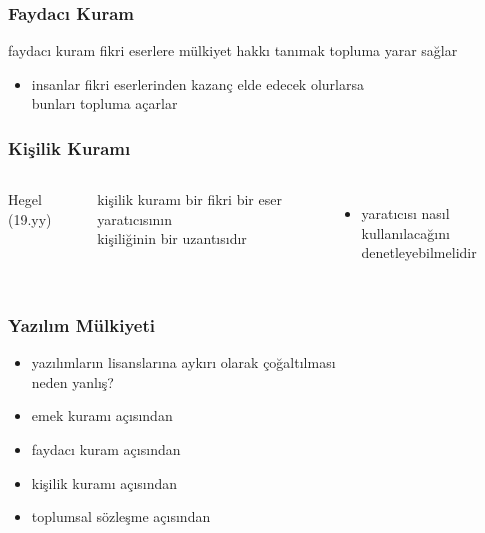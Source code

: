 \documentclass[dvipsnames]{beamer}
\theoremstyle{definition}
\theoremstyle{example}
\theoremstyle{plain}
\begin{document}
\begin{frame}
  \frametitle{Faydacı Kuram}

  \begin{block}{faydacı kuram}
    fikri eserlere mülkiyet hakkı tanımak topluma yarar sağlar
  \end{block}

  \begin{itemize}
    \item insanlar fikri eserlerinden kazanç elde edecek olurlarsa\\
      bunları topluma açarlar
  \end{itemize}
\end{frame}

\begin{frame}
  \frametitle{Kişilik Kuramı}

  \begin{columns}
    \begin{center}

      Hegel (19.yy)
    \end{center}

    \begin{block}{kişilik kuramı}
      bir fikri bir eser yaratıcısının\\
      kişiliğinin bir uzantısıdır
    \end{block}

    \begin{itemize}
      \item yaratıcısı nasıl kullanılacağını\\
        denetleyebilmelidir
    \end{itemize}
  \end{columns}
\end{frame}

\begin{frame}
  \frametitle{Yazılım Mülkiyeti}

  \begin{itemize}
    \item yazılımların lisanslarına aykırı olarak çoğaltılması\\
      neden yanlış?

    \pause
    \medskip
    \item emek kuramı açısından

    \pause
    \item faydacı kuram açısından

    \pause
    \item kişilik kuramı açısından

    \pause
    \item toplumsal sözleşme açısından
  \end{itemize}
\end{frame}
\end{document}
